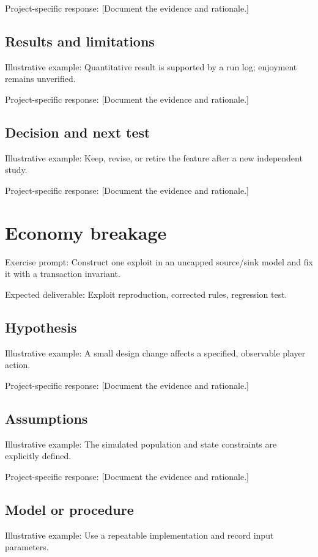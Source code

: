 \documentclass[11pt]{article}
\begin{document}
Project-specific response: [Document the evidence and rationale.]


\subsection{Results and limitations}
Illustrative example: Quantitative result is supported by a run log; enjoyment remains unverified.

Project-specific response: [Document the evidence and rationale.]


\subsection{Decision and next test}
Illustrative example: Keep, revise, or retire the feature after a new independent study.

Project-specific response: [Document the evidence and rationale.]


\section{Economy breakage}
Exercise prompt: Construct one exploit in an uncapped source/sink model and fix it with a transaction invariant.

Expected deliverable: Exploit reproduction, corrected rules, regression test.


\subsection{Hypothesis}
Illustrative example: A small design change affects a specified, observable player action.

Project-specific response: [Document the evidence and rationale.]


\subsection{Assumptions}
Illustrative example: The simulated population and state constraints are explicitly defined.

Project-specific response: [Document the evidence and rationale.]


\subsection{Model or procedure}
Illustrative example: Use a repeatable implementation and record input parameters.
\end{document}
